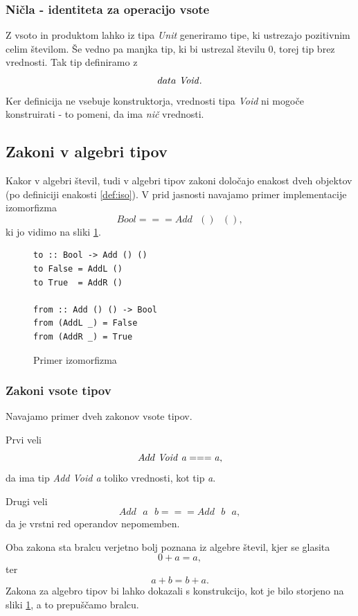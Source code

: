 \documentclass[a4paper, 12pt]{book}
\begin{document}
\subsubsection{Ničla - identiteta za operacijo vsote}

Z vsoto in produktom lahko iz tipa \emph{Unit} generiramo tipe, ki ustrezajo pozitivnim celim številom. Še vedno pa manjka tip, ki bi ustrezal številu $0$, torej tip brez vrednosti. Tak tip definiramo z
$$data\text{ \emph{Void}}.$$
Ker definicija ne vsebuje konstruktorja, vrednosti tipa \emph{Void} ni mogoče konstruirati - to pomeni, da ima \emph{nič} vrednosti.

\subsection{Zakoni v algebri tipov}

Kakor v algebri števil, tudi v algebri tipov zakoni določajo enakost dveh objektov (po definiciji enakosti \ref{def:iso}). V prid jasnosti navajamo primer implementacije izomorfizma
$$Bool===Add\text{ }()\text{ } (),$$
ki jo vidimo na sliki \ref{code:iso}.

\begin{figure}\label{code:iso}
\lstset{language=Haskell}
\begin{lstlisting}[frame=single]
to :: Bool -> Add () ()
to False = AddL ()
to True  = AddR ()

from :: Add () () -> Bool
from (AddL _) = False
from (AddR _) = True
\end{lstlisting}
\caption{Primer izomorfizma}
\end{figure}

\subsubsection{Zakoni vsote tipov}

Navajamo primer dveh zakonov vsote tipov. 

\noindent Prvi veli
$$Add\text{ \emph{Void}}\text{ \emph{a}}===\text{\emph{a}},$$
da ima tip \emph{Add Void a} toliko vrednosti, kot tip \emph{a}. 

\noindent Drugi veli
$$Add\text{ }a\text{ }b===Add\text{ }b\text{ }a,$$
da je vrstni red operandov nepomemben. 

\noindent Oba zakona sta bralcu verjetno bolj poznana iz algebre števil, kjer se glasita
$$0+a=a,$$
ter
$$a+b=b+a.$$
Zakona za algebro tipov bi lahko dokazali s konstrukcijo, kot je bilo storjeno na sliki \ref{code:iso}, a to prepuščamo bralcu.
\end{document}
